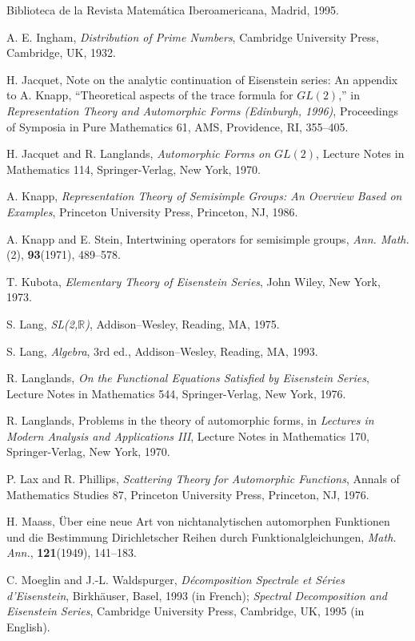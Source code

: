 \begin{enumerate}[label={[\arabic*]},leftmargin=2.8em,itemsep=0.35em,topsep=0.4em]
Biblioteca de la Revista Matem\'atica Iberoamericana, Madrid, 1995.
\item A. E. Ingham, \emph{Distribution of Prime Numbers}, Cambridge University Press,
Cambridge, UK, 1932.
\item H. Jacquet, Note on the analytic continuation of Eisenstein series: An appendix
to A. Knapp, ``Theoretical aspects of the trace formula for $GL(2)$,'' in
\emph{Representation Theory and Automorphic Forms (Edinburgh, 1996)}, Proceedings of
Symposia in Pure Mathematics 61, AMS, Providence, RI, 355--405.
\item H. Jacquet and R. Langlands, \emph{Automorphic Forms on $GL(2)$}, Lecture Notes
in Mathematics 114, Springer-Verlag, New York, 1970.
\item A. Knapp, \emph{Representation Theory of Semisimple Groups: An Overview Based
on Examples}, Princeton University Press, Princeton, NJ, 1986.
\item A. Knapp and E. Stein, Intertwining operators for semisimple groups,
\emph{Ann. Math.} (2), \textbf{93}(1971), 489--578.
\item T. Kubota, \emph{Elementary Theory of Eisenstein Series}, John Wiley, New York,
1973.
\item S. Lang, \emph{SL(2,$\mathbb{R}$)}, Addison--Wesley, Reading, MA, 1975.
\item S. Lang, \emph{Algebra}, 3rd ed., Addison--Wesley, Reading, MA, 1993.
\item R. Langlands, \emph{On the Functional Equations Satisfied by Eisenstein Series},
Lecture Notes in Mathematics 544, Springer-Verlag, New York, 1976.
\item R. Langlands, Problems in the theory of automorphic forms, in \emph{Lectures in
Modern Analysis and Applications III}, Lecture Notes in Mathematics 170,
Springer-Verlag, New York, 1970.
\item P. Lax and R. Phillips, \emph{Scattering Theory for Automorphic Functions},
Annals of Mathematics Studies 87, Princeton University Press, Princeton, NJ, 1976.
\item H. Maass, \"Uber eine neue Art von nichtanalytischen automorphen Funktionen und
die Bestimmung Dirichletscher Reihen durch Funktionalgleichungen, \emph{Math. Ann.},
\textbf{121}(1949), 141--183.
\item C. Moeglin and J.-L. Waldspurger, \emph{D\'ecomposition Spectrale et S\'eries
d'Eisenstein}, Birkh\"auser, Basel, 1993 (in French); \emph{Spectral Decomposition and
Eisenstein Series}, Cambridge University Press, Cambridge, UK, 1995 (in English).

\end{enumerate}
